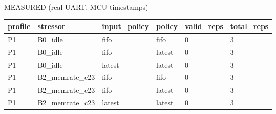 \par MEASURED (real UART, MCU timestamps)
\begin{tabular}{llllll}
profile & stressor & input\_policy & policy & valid\_reps & total\_reps \\ \hline
P1 & B0\_idle & fifo & fifo & 0 & 3 \\
P1 & B0\_idle & fifo & latest & 0 & 3 \\
P1 & B0\_idle & latest & latest & 0 & 3 \\
P1 & B2\_memrate\_c23 & fifo & fifo & 0 & 3 \\
P1 & B2\_memrate\_c23 & fifo & latest & 0 & 3 \\
P1 & B2\_memrate\_c23 & latest & latest & 0 & 3 \\
\end{tabular}
